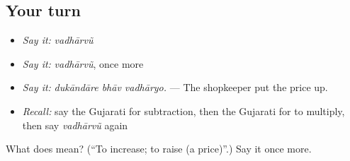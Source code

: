\subsection*{Your turn}
\begin{itemize}
\raggedright
  \item \emph{Say it:} \emph{vadhārvũ}
  \item \emph{Say it:} \emph{vadhārvũ}, once more
  \item \emph{Say it:} \emph{dukāndāre bhāv vadhāryo.} — The shopkeeper put the price up.
  \item \emph{Recall:} say the Gujarati for subtraction, then the Gujarati for to multiply, then say \emph{vadhārvũ} again
\end{itemize}

\begin{tcolorbox}[breakable,colback=teal!4,colframe=teal!35!black,title={Before you move on}]
What does  mean? (\textquotedblleft{}To increase; to raise (a price)\textquotedblright{}.) Say it once more.
\end{tcolorbox}
